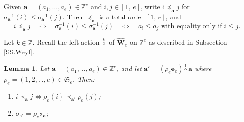 \documentclass[11pt,a4paper,reqno]{amsart}
\numberwithin{equation}{section}
\theoremstyle{plain}
\newtheorem{lem}[thm]{Lemma}
\theoremstyle{definition}
\newtheorem{Def}[thm]{Definition}
\theoremstyle{remark}
\numberwithin{equation}{section}
\newcommand{\ba}{\mathbf{a}}
\newcommand{\ZZ}{\mathbb{Z}}
\newcommand{\rr}{\rho}
\newcommand{\Be}{\mathbf{e}}
\newcommand{\EW}{\widehat{\mathbf{W}}}
\newcommand{\sym}[1]{\mathfrak{S}_{#1}}
\newcommand{\CDot}[1]{\mathrel{\overset{#1}{\circ}}}
\begin{document}
Given $\ba = (a_1,\dotsc, a_e) \in \ZZ^e$ and $i, j \in [1,\,e]$, write $i \preceq_{\ba} j$ for $\sigma_{\ba}^{-1}(i) \leq \sigma_{\ba}^{-1}(j)$. Then $\preceq_{\ba}$ is a total order $[1,\,e]$, 
and
$$
i \preceq_{\ba} j 
\quad \Leftrightarrow \quad \sigma_{\ba}^{-1}(i) \leq \sigma_{\ba}^{-1}(j)
\quad \Leftrightarrow \quad a_i \leq a_j \text{ with equality only if } i \leq j.
$$

Let $k \in \ZZ$. Recall the left action $\CDot{k}$ of $\EW_e$ on $\ZZ^e$ as described in Subsection \ref{SS:Weyl}.

\begin{lem} \label{L:sigma}
Let $\ba = (a_1,\dotsc, a_e) \in \ZZ^e$, and
let $\ba' = (\rr_e \Be_e) \CDot{1} \ba$ where $\rr_e = (1,2,\dotsc, e) \in \sym{e}$.  Then:
\begin{enumerate}
\item $i \prec_{\ba} j \Leftrightarrow \rr_e(i) \prec_{\ba'} \rr_e(j)$;
\item $\sigma_{\ba'} = \rr_e \sigma_{\ba}$;
\end{enumerate}
\end{lem}
\end{document}
